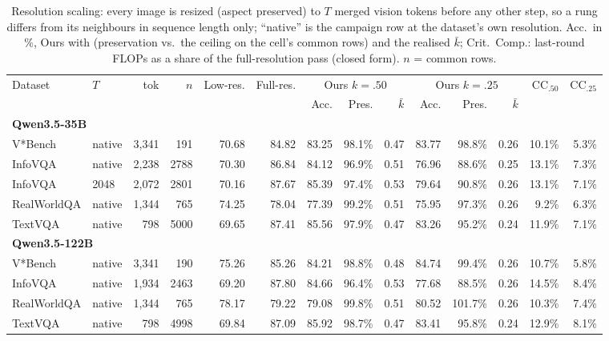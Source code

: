 \begin{table}[t]
\centering
\small
\caption{Resolution scaling: every image is resized (aspect preserved) to $T$ merged vision tokens before any other step, so a rung differs from its neighbours in sequence length only; ``native'' is the campaign row at the dataset's own resolution. Acc.\ in \%, Ours with (preservation vs.\ the ceiling on the cell's common rows) and the realised $\bar k$; Crit.\ Comp.: last-round FLOPs as a share of the full-resolution pass (closed form). $n$ = common rows.}
\label{tab:scaling}
\begin{tabular}{llrrrrrrrrrrrr}
\toprule
\multirow{2}{*}{Dataset} & \multirow{2}{*}{$T$} & \multirow{2}{*}{tok} & \multirow{2}{*}{$n$} & \multirow{2}{*}{Low-res.} & \multirow{2}{*}{Full-res.} & \multicolumn{3}{c}{Ours $k{=}.50$} & \multicolumn{3}{c}{Ours $k{=}.25$} & \multirow{2}{*}{CC$_{.50}$} & \multirow{2}{*}{CC$_{.25}$} \\
\cmidrule(lr){7-9} \cmidrule(lr){10-12}
 & & & & & & Acc. & Pres. & $\bar k$ & Acc. & Pres. & $\bar k$ & & \\
\midrule
\multicolumn{10}{l}{\textbf{Qwen3.5-35B}} \\
V*Bench & native & 3,341 & 191 & 70.68 & 84.82 & 83.25 & 98.1\% & 0.47 & 83.77 & 98.8\% & 0.26 & 10.1\% & 5.3\% \\
InfoVQA & native & 2,238 & 2788 & 70.30 & 86.84 & 84.12 & 96.9\% & 0.51 & 76.96 & 88.6\% & 0.25 & 13.1\% & 7.3\% \\
InfoVQA & 2048 & 2,072 & 2801 & 70.16 & 87.67 & 85.39 & 97.4\% & 0.53 & 79.64 & 90.8\% & 0.26 & 13.1\% & 7.1\% \\
RealWorldQA & native & 1,344 & 765 & 74.25 & 78.04 & 77.39 & 99.2\% & 0.51 & 75.95 & 97.3\% & 0.26 & 9.2\% & 6.3\% \\
TextVQA & native & 798 & 5000 & 69.65 & 87.41 & 85.56 & 97.9\% & 0.47 & 83.26 & 95.2\% & 0.24 & 11.9\% & 7.1\% \\
\midrule
\multicolumn{10}{l}{\textbf{Qwen3.5-122B}} \\
V*Bench & native & 3,341 & 190 & 75.26 & 85.26 & 84.21 & 98.8\% & 0.48 & 84.74 & 99.4\% & 0.26 & 10.7\% & 5.8\% \\
InfoVQA & native & 1,934 & 2463 & 69.20 & 87.80 & 84.66 & 96.4\% & 0.53 & 77.68 & 88.5\% & 0.26 & 14.5\% & 8.4\% \\
RealWorldQA & native & 1,344 & 765 & 78.17 & 79.22 & 79.08 & 99.8\% & 0.51 & 80.52 & 101.7\% & 0.26 & 10.3\% & 7.4\% \\
TextVQA & native & 798 & 4998 & 69.84 & 87.09 & 85.92 & 98.7\% & 0.47 & 83.41 & 95.8\% & 0.24 & 12.9\% & 8.1\% \\

\end{tabular}
\end{table}
